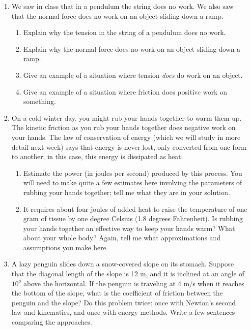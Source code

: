 \documentclass[12pt]{article}
\begin{document}
\Large
\centerline{}
\normalsize
\centerline{}

\begin{enumerate}

  \item{We saw in class that in a pendulum the string does no work. We also saw that the normal force does no work on an object sliding down a ramp.}
    \begin{enumerate}
      \item{Explain why the tension in the string of a pendulum does no work.}
      \item{Explain why the normal force does no work on an object sliding down a ramp.}
      \item{Give an example of a situation where tension {\it does} do work on an object.}
      \item{Give an example of a situation where friction does positive work on something.}
    \end{enumerate}

\item On a cold winter day, you might rub your hands together to warm them up. The kinetic friction as you rub your hands together does negative work on your hands.
The law of conservation of energy (which we will study in more detail next week) says that energy is never lost, only converted from one form to another; in this case,
this energy is dissipated as heat. 
\begin{enumerate}
\item Estimate the power (in joules per second) produced by this process. You will need to make quite a few estimates here involving the
parameters of rubbing your hands together; tell me what they are in your solution. 
  
\item It requires about four joules of added heat to raise the temperature of one gram of tissue by one degree Celsius (1.8 degrees Fahrenheit). 
Is rubbing your hands together an effective way to keep your hands warm?
What about your whole body? Again, tell me what approximations and assumptions you make here.
\end{enumerate}

  \item{A lazy penguin slides down a snow-covered slope on its stomach. Suppose that the diagonal length of the slope is 12 m, and it is inclined at an angle of $10^o$ above the horizontal. If the penguin is traveling at 4 m/s when it 
    reaches the bottom of the slope, what is the coefficient of friction between the penguin and the slope? Do this problem twice: once with Newton's second law and kinematics, and once with energy methods. Write a few sentences comparing the 
  approaches.}


\end{enumerate}
\end{document}
